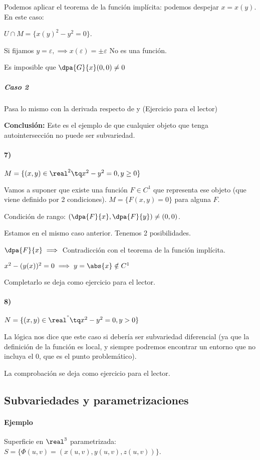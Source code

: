 Podemos aplicar el teorema de la función implícita: podemos despejar $x = x(y)$. En este caso:

$U \cap M = \{x(y)^2-y^2 = 0\}$.

Si fijamos $y=\varepsilon, \implies x(\varepsilon) = \pm \varepsilon$ No es una función. 

Es imposible que $\dpa{G}{x}(0,0) \neq 0$

\subparagraph{Caso 2} Pasa lo mismo con la derivada respecto de y (Ejercicio para el lector)


\textbf{Conclusión: } Este es el ejemplo de que cualquier objeto que tenga autointersección no puede ser subvariedad.


\paragraph{7)} $M = \{(x,y) \in \real^2 \tq x^2-y^2 = 0, y\ge 0\}$

Vamos a suponer que existe una función $F \in C^1$ que representa ese objeto (que viene definido por 2 condiciones). $M = \{F(x,y) = 0\}$ para alguna $F$.

Condición de rango: $\left(\dpa{F}{x},\dpa{F}{y}\right) \neq (0,0)$.

Estamos en el mismo caso anterior. Tenemos 2 posibilidades.

 $\dpa{F}{x} \implies $ Contradicción con el teorema de la función implícita.
 
 $x^2 - (y(x))^2 = 0 \implies y = \abs{x} \notin C^1$
 
 Completarlo se deja como ejercicio para el lector.

\paragraph{8)}

$N = \{(x,y)\in \real^" \tq x^2-y^2 = 0, y>0\}$

La lógica nos dice que este caso si debería ser subvariedad diferencial (ya que la definición de la función es local, y siempre podremos encontrar un entorno que no incluya el 0, que es el punto problemático).

La comprobación se deja como ejercicio para el lector.

\subsection{Subvariedades y parametrizaciones}
\paragraph{Ejemplo} Superficie en $\real^3$ parametrizada: $S = \{\Phi(u,v) = (x(u,v),y(u,v),z(u,v))\}$.

